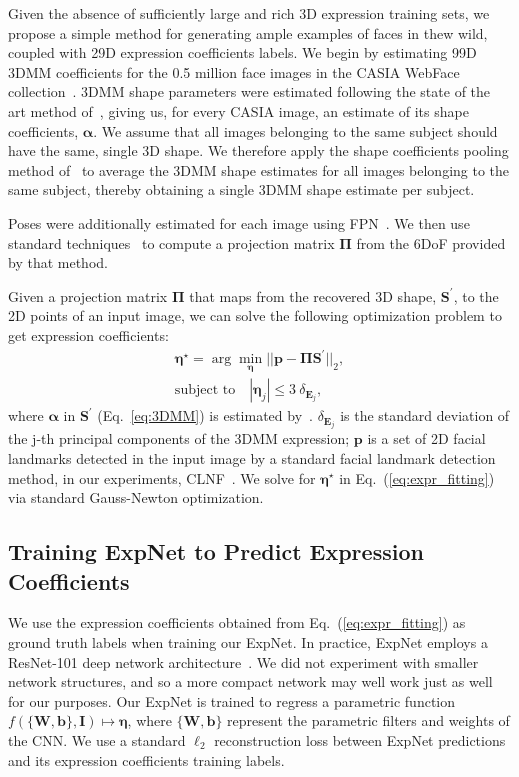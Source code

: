 \documentclass[a4paper, 10pt, conference]{ieeeconf}
\def\mbf#1{\mathbf{#1}}
\begin{document}
Given the absence of sufficiently large and rich 3D expression training sets, we propose a simple method for generating ample examples of faces in thew wild, coupled with 29D expression coefficients labels. We begin by estimating 99D 3DMM coefficients for the 0.5 million face images in the CASIA WebFace collection~\cite{yi2014learning}. 3DMM shape parameters were estimated following the state of the art method of~\cite{tran16_3dmm_cnn}, giving us, for every CASIA image, an estimate of its shape coefficients, $\boldsymbol{\alpha}$. We assume that all images belonging to the same subject should have the same, single 3D shape. We therefore apply the shape coefficients pooling method of~\cite{tran16_3dmm_cnn} to average the 3DMM shape estimates for all images belonging to the same subject, thereby obtaining a single 3DMM shape estimate per subject.

Poses were additionally estimated for each image using FPN~\cite{chang17fpn}. We then use standard techniques~\cite{hartley2003multiple} to compute a projection matrix $\boldsymbol{\Pi}$ from the 6DoF provided by that method.


Given a projection matrix $\boldsymbol{\Pi}$ that maps from the recovered 3D shape, $\mbf{S}^{\prime}$, to the 2D points of an input image, we can solve the following optimization problem to get expression coefficients:
\begin{equation}
\begin{split}
\boldsymbol{\eta}^{\star} = \arg\min_{\boldsymbol{\eta}} || \mbf{p} - \boldsymbol{\Pi} \mbf{S}^{\prime} ||_2, \\
\text{subject to} \quad |\boldsymbol{\eta}_j| \leq 3~{\delta}_{\mbf{E}_j},
\end{split}
\label{eq:expr_fitting}
\end{equation}
where $\boldsymbol{\alpha}$ in $\mbf{S}^{\prime}$ (Eq.~\ref{eq:3DMM}) is estimated by~\cite{tran16_3dmm_cnn}. ${\delta}_{\mbf{E}_j}$ is the standard deviation of the j-th principal components of the 3DMM expression; $\mbf{p}$ is a set of 2D facial landmarks detected in the input image by a standard facial landmark detection method, in our experiments, CLNF~\cite{baltrusaitis2013constrained}. We solve for $\boldsymbol{\eta}^{\star}$ in Eq.~(\ref{eq:expr_fitting}) via standard Gauss-Newton optimization.




\subsection{Training ExpNet to Predict Expression Coefficients}\label{sec:training}
We use the expression coefficients obtained from Eq.~(\ref{eq:expr_fitting}) as ground truth labels when training our ExpNet. In practice, ExpNet employs a ResNet-101 deep network architecture~\cite{He_2016_CVPR}. We did not experiment with smaller network structures, and so a more compact network may well work just as well for our purposes. Our ExpNet is trained to regress a parametric function $f(\{\mbf{W},\mbf{b}\}, \mbf{I}) \mapsto \boldsymbol{\eta}$, where $\{\mbf{W},\mbf{b}\}$ represent the parametric filters and weights of the CNN. We use a standard $\ell_2$ reconstruction loss between ExpNet predictions and its expression coefficients training labels.
\end{document}
